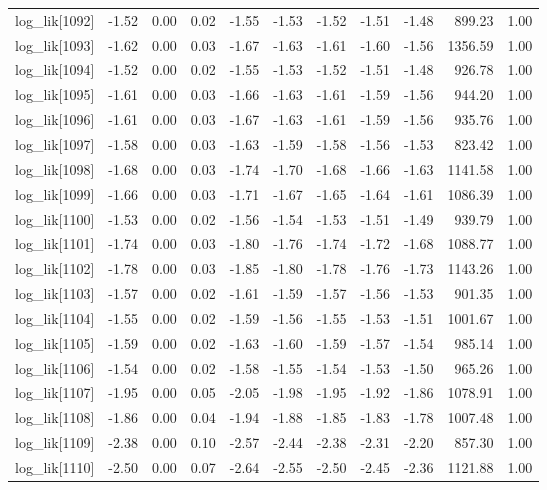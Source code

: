 \begin{table}[ht]
\begin{tabular}{rrrrrrrrrrr}
  log\_lik[1092] & -1.52 & 0.00 & 0.02 & -1.55 & -1.53 & -1.52 & -1.51 & -1.48 & 899.23 & 1.00 \\ 
  log\_lik[1093] & -1.62 & 0.00 & 0.03 & -1.67 & -1.63 & -1.61 & -1.60 & -1.56 & 1356.59 & 1.00 \\ 
  log\_lik[1094] & -1.52 & 0.00 & 0.02 & -1.55 & -1.53 & -1.52 & -1.51 & -1.48 & 926.78 & 1.00 \\ 
  log\_lik[1095] & -1.61 & 0.00 & 0.03 & -1.66 & -1.63 & -1.61 & -1.59 & -1.56 & 944.20 & 1.00 \\ 
  log\_lik[1096] & -1.61 & 0.00 & 0.03 & -1.67 & -1.63 & -1.61 & -1.59 & -1.56 & 935.76 & 1.00 \\ 
  log\_lik[1097] & -1.58 & 0.00 & 0.03 & -1.63 & -1.59 & -1.58 & -1.56 & -1.53 & 823.42 & 1.00 \\ 
  log\_lik[1098] & -1.68 & 0.00 & 0.03 & -1.74 & -1.70 & -1.68 & -1.66 & -1.63 & 1141.58 & 1.00 \\ 
  log\_lik[1099] & -1.66 & 0.00 & 0.03 & -1.71 & -1.67 & -1.65 & -1.64 & -1.61 & 1086.39 & 1.00 \\ 
  log\_lik[1100] & -1.53 & 0.00 & 0.02 & -1.56 & -1.54 & -1.53 & -1.51 & -1.49 & 939.79 & 1.00 \\ 
  log\_lik[1101] & -1.74 & 0.00 & 0.03 & -1.80 & -1.76 & -1.74 & -1.72 & -1.68 & 1088.77 & 1.00 \\ 
  log\_lik[1102] & -1.78 & 0.00 & 0.03 & -1.85 & -1.80 & -1.78 & -1.76 & -1.73 & 1143.26 & 1.00 \\ 
  log\_lik[1103] & -1.57 & 0.00 & 0.02 & -1.61 & -1.59 & -1.57 & -1.56 & -1.53 & 901.35 & 1.00 \\ 
  log\_lik[1104] & -1.55 & 0.00 & 0.02 & -1.59 & -1.56 & -1.55 & -1.53 & -1.51 & 1001.67 & 1.00 \\ 
  log\_lik[1105] & -1.59 & 0.00 & 0.02 & -1.63 & -1.60 & -1.59 & -1.57 & -1.54 & 985.14 & 1.00 \\ 
  log\_lik[1106] & -1.54 & 0.00 & 0.02 & -1.58 & -1.55 & -1.54 & -1.53 & -1.50 & 965.26 & 1.00 \\ 
  log\_lik[1107] & -1.95 & 0.00 & 0.05 & -2.05 & -1.98 & -1.95 & -1.92 & -1.86 & 1078.91 & 1.00 \\ 
  log\_lik[1108] & -1.86 & 0.00 & 0.04 & -1.94 & -1.88 & -1.85 & -1.83 & -1.78 & 1007.48 & 1.00 \\ 
  log\_lik[1109] & -2.38 & 0.00 & 0.10 & -2.57 & -2.44 & -2.38 & -2.31 & -2.20 & 857.30 & 1.00 \\ 
  log\_lik[1110] & -2.50 & 0.00 & 0.07 & -2.64 & -2.55 & -2.50 & -2.45 & -2.36 & 1121.88 & 1.00 \\ 

\end{tabular}
\end{table}
